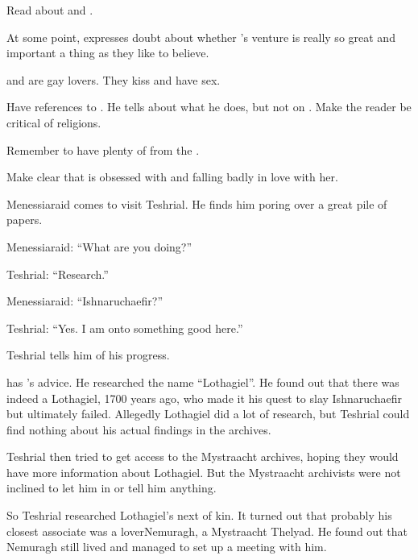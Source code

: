 

Read about  and .

At some point, \Menessiaraid expresses doubt about whether \Teshrial's \Malcur venture is really so great and important a thing as they like to believe. 

\Teshrial and \Menessiaraid are gay lovers. 
They kiss and have sex. 

Have references to .
He tells \Teshrial about what he does, but not on \Azmith.
Make the reader be critical of religions. 


\begin{comment}
  \section{Teshrial sits with notes}
\end{comment}

Remember to have plenty of  from the \resphain. 

Make clear that \Teshrial is obsessed with \Firaxel and falling badly in love with her. 

Menessiaraid comes to visit Teshrial.
He finds him poring over a great pile of papers. 

Menessiaraid:
``What are you doing?''

Teshrial:
``Research.''

Menessiaraid:
``Ishnaruchaefir?''

Teshrial:
``Yes. I am onto something good here.''

Teshrial tells him of his progress.

\Teshrial has \Dezruth's advice. 
He researched the name ``Lothagiel''. 
He found out that there was indeed a Lothagiel, 1700 years ago, who made it his quest to slay Ishnaruchaefir but ultimately failed. 
Allegedly Lothagiel did a lot of research, but Teshrial could find nothing about his actual findings in the \CiriathSepher archives. 

Teshrial then tried to get access to the Mystraacht archives, hoping they would have more information about Lothagiel. 
But the Mystraacht archivists were not inclined to let him in or tell him anything. 

So Teshrial researched Lothagiel's next of kin. 
It turned out that probably his closest associate was a lover\dash Nemuragh, a Mystraacht Thelyad. 
He found out that Nemuragh still lived and managed to set up a meeting with him. 

